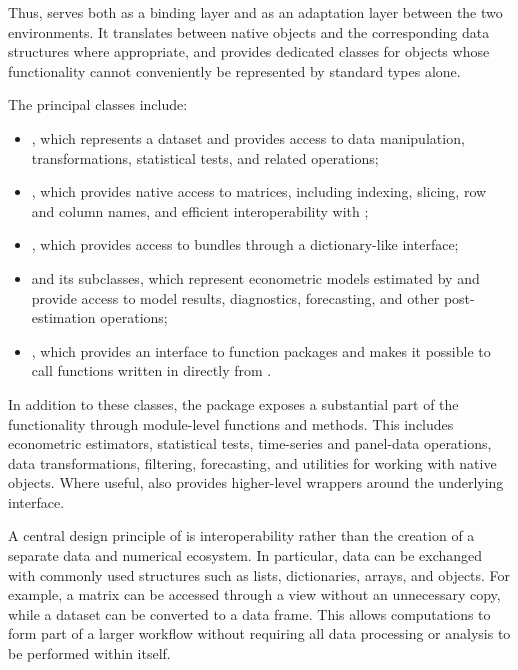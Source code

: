 Thus, \gretlpy serves both as a binding layer and as an adaptation
layer between the two environments. It translates between native
\python objects and the corresponding \lgretl data structures where
appropriate, and provides dedicated classes for objects whose
functionality cannot conveniently be represented by standard
\python types alone.

The principal \gretlpy classes include:
\begin{itemize}
	\item \classpydataset, which represents a \gretl dataset and
	provides access to data manipulation, transformations,
	statistical tests, and related operations;
	\item \classpymatrix, which provides native access to
	\gretl matrices, including indexing, slicing, row and column
	names, and efficient interoperability with ;
	\item \classpybundle, which provides access to \gretl bundles
	through a dictionary-like interface;
	\item \classpymodel and its subclasses, which represent
	econometric models estimated by \lgretl and provide access
	to model results, diagnostics, forecasting, and other
	post-estimation operations;
	\item {}, which provides an interface to
	\gretl function packages and makes it possible to call
	functions written in \hansl directly from \python.
\end{itemize}

In addition to these classes, the package exposes a substantial part
of the \lgretl functionality through module-level functions and
methods. This includes econometric estimators, statistical tests,
time-series and panel-data operations, data transformations, filtering,
forecasting, and utilities for working with native \gretl objects.
Where useful, \gretlpy also provides higher-level \python wrappers
around the underlying \lgretl interface.

A central design principle of \gretlpy is interoperability rather than
the creation of a separate data and numerical ecosystem. In
particular, data can be exchanged with commonly used \python
structures such as lists, dictionaries,  arrays, and
 objects. For example, a \gretl matrix can be accessed
through a  view without an unnecessary copy, while a
\gretl dataset can be converted to a  data frame. This
allows \lgretl computations to form part of a larger \python workflow
without requiring all data processing or analysis to be performed
within \gretlpy itself.

